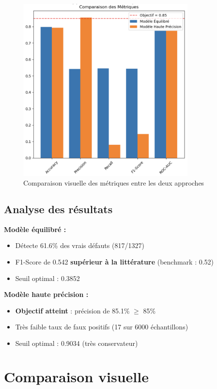 \documentclass[11pt,a4paper]{article}
\begin{document}
\begin{figure}[H]
\centering
\includegraphics[width=0.8\textwidth]{comparaison_metriques.png}
\caption{Comparaison visuelle des métriques entre les deux approches}
\label{fig:metriques}
\end{figure}

\subsection{Analyse des résultats}

\textbf{Modèle équilibré :} 
\begin{itemize}
    \item Détecte 61.6\% des vrais défauts (817/1327)
    \item F1-Score de 0.542 \textbf{supérieur à la littérature} (benchmark : 0.52)
    \item Seuil optimal : 0.3852
\end{itemize}

\textbf{Modèle haute précision :}
\begin{itemize}
    \item \textbf{Objectif atteint} : précision de 85.1\% $\geq$ 85\%
    \item Très faible taux de faux positifs (17 sur 6000 échantillons)
    \item Seuil optimal : 0.9034 (très conservateur)
\end{itemize}

\section{Comparaison visuelle}
\end{document}
